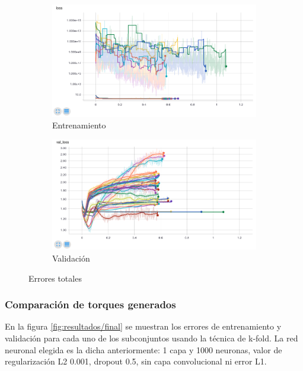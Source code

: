 \begin{figure}[thb]
	\begin{subfigure}[b]{0.9\textwidth}
		\centering
		\includegraphics[width=\linewidth]{imagenes/resultados/loss_all.png}
		\caption{Entrenamiento}
		\label{fig:resultados/loss_all}
	\end{subfigure}
	\begin{subfigure}[b]{0.9\textwidth}
		\centering
		\includegraphics[width=\linewidth]{imagenes/resultados/val_loss_all.png}
		\caption{Validación}
		\label{fig:resultados/val_loss_all}
	\end{subfigure}
	\caption{Errores totales}
	\label{fig:resultados/all}
\end{figure}

\subsubsection{Comparación de torques generados}
En la figura \ref{fig:resultados/final} se muestran los errores de entrenamiento y validación para cada uno de los subconjuntos usando la técnica de k-fold. La red neuronal elegida es la dicha anteriormente: 1 capa y 1000 neuronas, valor de regularización L2 0.001, dropout 0.5, sin capa convolucional ni error L1.

